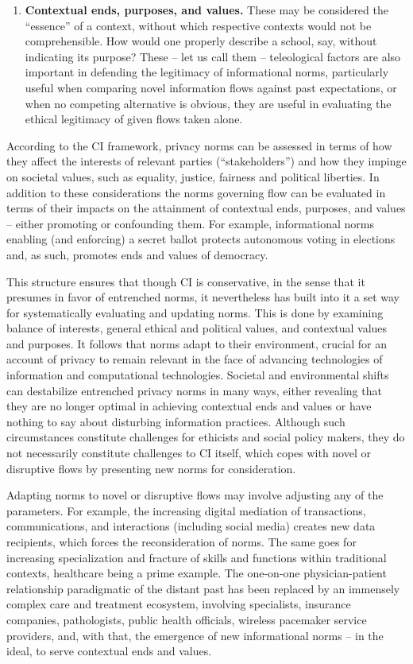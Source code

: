 \documentclass[../thesis.tex]{subfiles}
\begin{document}
\begin{enumerate}
\item  \textbf{Contextual ends, purposes, and values.} These may be
considered the ``essence'' of a
context, without which respective contexts would not be comprehensible.
How would one properly describe a school, say, without indicating its
purpose? These -- let us call them -- teleological factors are also
important in defending the legitimacy of informational norms,
particularly useful when comparing novel information flows against past
expectations, or when no competing alternative is obvious, they are
useful in evaluating the ethical legitimacy of given flows taken alone.

\end{enumerate}

According to the CI framework, privacy norms can be assessed in terms of
how they affect the interests of relevant parties
(``stakeholders'') and how they
impinge on societal values, such as equality, justice, fairness and
political liberties. In addition to these considerations the norms
governing flow can be evaluated in terms of their impacts on the
attainment of contextual ends, purposes, and values -- either promoting
or confounding them. For example, informational norms enabling (and
enforcing) a secret ballot protects autonomous voting in elections and,
as such, promotes ends and values of democracy.

This structure ensures that though CI is conservative, in the sense that
it presumes in favor of entrenched norms, it nevertheless has built
into it a set way for systematically evaluating and updating norms.
This is done by examining balance of interests, general ethical and
political values, and contextual values and purposes. It follows that
norms adapt to their environment, crucial for an account of privacy to
remain relevant in the face of advancing technologies of information
and computational technologies. Societal and environmental shifts can
destabilize entrenched privacy norms in many ways, either revealing
that they are no longer optimal in achieving contextual ends and values
or have nothing to say about disturbing information practices. Although
such circumstances constitute challenges for ethicists and social
policy makers, they do not necessarily constitute challenges to CI
itself, which copes with novel or disruptive flows by presenting new
norms for consideration.

Adapting norms to novel or disruptive flows may involve adjusting any of
the parameters. For example, the increasing digital mediation of
transactions, communications, and interactions (including social media)
creates new data recipients, which forces the reconsideration of norms.
The same goes for increasing specialization and fracture of skills and
functions within traditional contexts, healthcare being a prime
example. The one-on-one physician-patient relationship paradigmatic of
the distant past has been replaced by an immensely complex care and
treatment ecosystem, involving specialists, insurance companies,
pathologists, public health officials, wireless pacemaker service
providers, and, with that, the emergence of new informational norms --
in the ideal, to serve contextual ends and values.
\end{document}

